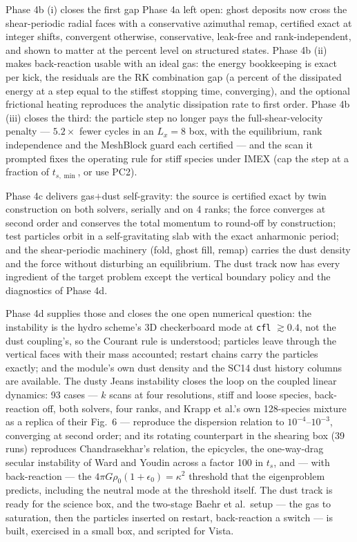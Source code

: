 \documentclass[11pt]{article}
\newcommand{\code}[1]{\texttt{#1}}
\begin{document}
Phase 4b (i) closes the first gap Phase 4a left open: ghost deposits now cross the
shear-periodic radial faces with a conservative azimuthal remap, certified exact at
integer shifts, convergent otherwise, conservative, leak-free and rank-independent,
and shown to matter at the percent level on structured states. Phase 4b (ii) makes
back-reaction usable with an ideal gas: the energy bookkeeping is exact per kick, the
residuals are the RK combination gap (a percent of the dissipated energy at a step
equal to the stiffest stopping time, converging), and the optional frictional heating
reproduces the analytic dissipation rate to first order. Phase 4b (iii) closes the
third: the particle step no longer pays the full-shear-velocity penalty --- $5.2\times$
fewer cycles in an $L_x = 8$ box, with the equilibrium, rank independence and the
MeshBlock guard each certified --- and the scan it prompted fixes the operating rule for
stiff species under IMEX (cap the step at a fraction of $t_{s,\min}$, or use PC2).

Phase 4c delivers gas$+$dust self-gravity: the source is certified exact by twin
construction on both solvers, serially and on 4 ranks; the force converges at second
order and conserves the total momentum to round-off by construction; test particles
orbit in a self-gravitating slab with the exact anharmonic period; and the shear-periodic
machinery (fold, ghost fill, remap) carries the dust density and the force without
disturbing an equilibrium. The dust track now has every ingredient of the target
problem except the vertical boundary policy and the diagnostics of Phase 4d.

Phase 4d supplies those and closes the one open numerical question: the instability is
the hydro scheme's 3D checkerboard mode at \code{cfl} $\gtrsim 0.4$, not the dust
coupling's, so the Courant rule is understood; particles leave through the vertical
faces with their mass accounted; restart chains carry the particles exactly; and the
module's own dust density and the SC14 dust history columns are available. The dusty
Jeans instability closes the loop on the coupled linear dynamics: 93 cases ---
$k$ scans at four resolutions, stiff and loose species, back-reaction off, both
solvers, four ranks, and Krapp et al.'s own 128-species mixture as a replica of their
Fig.\ 6 --- reproduce the dispersion relation to $10^{-4}$--$10^{-3}$, converging at
second order; and its rotating counterpart in the shearing box (39 runs) reproduces
Chandrasekhar's relation, the epicycles, the one-way-drag secular instability of Ward
and Youdin across a factor 100 in $t_s$, and --- with back-reaction --- the
$4\pi G\rho_0(1+\epsilon_0) = \kappa^2$ threshold that the eigenproblem predicts,
including the neutral mode at the threshold itself. The dust
track is ready for the science box, and the two-stage Baehr et al.\ setup --- the
gas to saturation, then the particles inserted on restart, back-reaction a switch ---
is built, exercised in a small box, and scripted for Vista.
\end{document}
